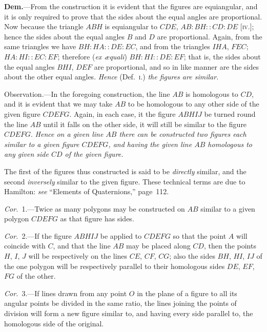 \documentclass[oneside]{book}
\begin{document}
\textbf{Dem.}---From the construction it is\label{isis} %
evident that the
figures are equiangular, and it is only required to prove
that the sides about the equal angles are proportional.
Now because the triangle $ABH$ is equiangular to $CDE$,
$AB : BH :: CD : DE$ [\textsc{iv.}]; hence the sides about the
equal angles $B$ and $D$ are proportional. Again, from
the same triangles we have $BH : HA :: DE : EC$, and
from the triangles $IHA$, $FEC$; $HA : HI :: EC : EF$;
therefore (\emph{ex {\ae}quali}) $BH : HI :: DE : EF$; that is, the
sides about the equal angles $BHI$, $DEF$ are proportional,
and so in like manner are the sides about the
other equal angles. \emph{Hence} (Def.~\textsc{i.}) \emph{the figures are
similar.}

\smallskip
\begin{footnotesize}
\textsf{Observation.}---In the foregoing construction, the line $AB$ is
homologous to $CD$, and it is evident that we may take $AB$ to
be homologous to any other side of the given figure $CDEFG$.
Again, in each case, it the figure $ABHIJ$ be turned round the line
$AB$ until it falls on the other side, it will still be similar to the
figure $CDEFG$. \emph{Hence on a given line $AB$ there can be constructed
two figures each similar to a given figure $CDEFG$, and having the
given line $AB$ homologous to any given side $CD$ of the given figure.}

The first of the figures thus constructed is said to be \emph{directly}
similar, and the second \emph{inversely} similar to the given figure.
These technical terms are due to Hamilton: \emph{see} ``Elements of
Quaternions,'' page~112.
\par\end{footnotesize}

\emph{Cor.}~1.---Twice as many polygons may be constructed
on $AB$ similar to a given polygon $CDEFG$ as
that figure has sides.

\emph{Cor.}~2.---If the figure $ABHIJ$ be applied to $CDEFG$
so that the point $A$ will coincide with $C$, and that the
line $AB$ may be placed along $CD$, then the points $H$, $I$, $J$
will be respectively on the lines $CE$, $CF$, $CG$; also the
sides $BH$, $HI$, $IJ$ of the one polygon will be respectively
parallel to their homologous sides $DE$, $EF$, $FG$
of the other.

\emph{Cor.}~3.---If lines drawn from any point $O$ in the
plane of a figure to all its angular points be divided in
the same ratio, the lines joining the points of division
will form a new figure similar to, and having every
side parallel to, the homologous side of the original.
\end{document}
